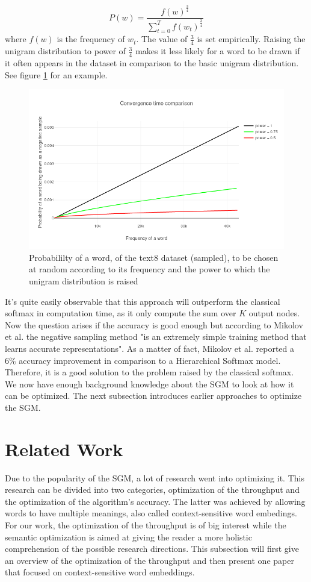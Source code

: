 \documentclass[conference]{IEEEtran}
\begin{document}
\begin{equation} \label{eq:unigram}
P(w)=\frac{f(w)^{\frac{3}{4}}}{\sum_{t=0}^{T} f(w_t)^{\frac{3}{4}}}
\end{equation}
where $f(w)$ is the frequency of $w_t$. The value of $\frac{3}{4}$ is set empirically. Raising the unigram distribution to power of $\frac{3}{4}$ makes it less likely for a word to be drawn if it often appears in the dataset in comparison to the basic unigram distribution. See figure \ref{fig:frequency_ex} for an example.
\begin{figure}[ht]
\centering
\includegraphics[scale=0.45]{images/frequency_ex}
\caption{Probabililty of a word, of the text8 dataset (sampled), to be chosen at random according to its frequency and the power to which the unigram distribution is raised}
\label{fig:frequency_ex}
\end{figure}
It's quite easily observable that this approach will outperform the classical softmax in computation time, as it only compute the sum over $K$ output nodes. Now the question arises if the accuracy is good enough but according to Mikolov et al. \cite{mikolov2} the negative sampling method "is an extremely simple training method that learns accurate representations". As a matter of fact, Mikolov et al. \cite{mikolov2} reported a 6\% accuracy improvement in comparison to a Hierarchical Softmax model. Therefore, it is a good solution to the problem raised by the classical softmax.
We now have enough background knowledge about the SGM to look at how it can be optimized. The next subsection introduces earlier approaches to optimize the SGM.

\section{Related Work}
Due to the popularity of the SGM, a lot of research went into optimizing it. This research can be divided into two categories, optimization of the throughput and the optimization of the algorithm's accuracy. The latter was achieved by allowing words to have multiple meanings, also called context-sensitive word embedings. For our work, the optimization of the throughput is of big interest while the semantic optimization is aimed at giving the reader a more holistic comprehension of the possible research directions.
This subsection will first give an overview of the optimization of the throughput and then present one paper that focused on context-sensitive word embeddings.
\end{document}
